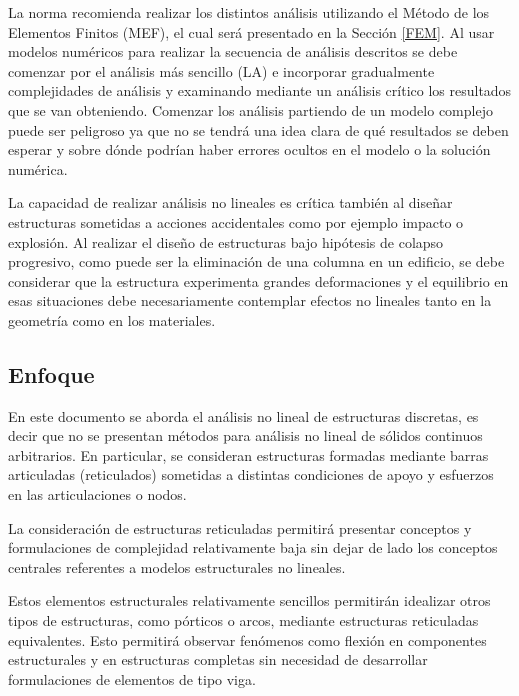 La norma recomienda realizar los distintos análisis utilizando el Método de los Elementos Finitos (MEF), el cual será presentado en la Sección \ref{FEM}. %
%
Al usar modelos numéricos para realizar la secuencia de análisis descritos se debe comenzar por el análisis más sencillo (LA) e incorporar gradualmente complejidades de análisis y examinando mediante un análisis crítico los resultados que se van obteniendo. %
%
Comenzar los análisis partiendo de un modelo complejo puede ser peligroso ya que no se tendrá una idea clara de qué resultados se deben esperar y sobre dónde podrían haber errores ocultos en el modelo o la solución numérica.

La capacidad de realizar análisis no lineales es crítica también al diseñar estructuras sometidas a acciones accidentales como por ejemplo impacto o explosión. Al realizar el diseño de estructuras bajo hipótesis de colapso progresivo, como puede ser la eliminación de una columna en un edificio, se debe considerar que la estructura experimenta grandes deformaciones y el equilibrio en esas situaciones debe necesariamente contemplar efectos no lineales tanto en la geometría como en los materiales.

\subsection*{Enfoque}

En este documento se aborda el análisis no lineal de estructuras discretas, es decir que no se presentan métodos para análisis no lineal de sólidos continuos arbitrarios. %
%
En particular, se consideran estructuras formadas mediante barras articuladas (reticulados) sometidas a distintas condiciones de apoyo y esfuerzos en las articulaciones o nodos. %



La consideración de estructuras reticuladas permitirá presentar conceptos y formulaciones de complejidad relativamente baja sin dejar de lado los conceptos centrales referentes a modelos estructurales no lineales. 

Estos elementos estructurales relativamente sencillos permitirán idealizar otros tipos de estructuras, como pórticos o arcos, mediante estructuras reticuladas equivalentes. %
%
Esto permitirá observar fenómenos como flexión en componentes estructurales y en estructuras completas sin necesidad de desarrollar formulaciones de elementos de tipo viga. %

